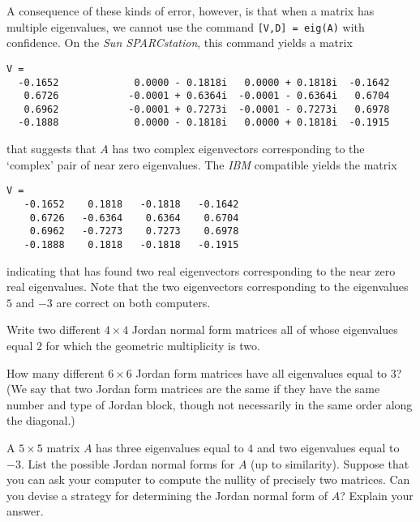 A consequence of these kinds of error, however, is that when a matrix
has multiple eigenvalues, we cannot use the command {\tt [V,D] = eig(A)} 
with confidence. On the {\em Sun SPARCstation\/}, this command yields 
a matrix 
\begin{verbatim}
V = 
  -0.1652             0.0000 - 0.1818i   0.0000 + 0.1818i  -0.1642          
   0.6726            -0.0001 + 0.6364i  -0.0001 - 0.6364i   0.6704          
   0.6962            -0.0001 + 0.7273i  -0.0001 - 0.7273i   0.6978          
  -0.1888             0.0000 - 0.1818i   0.0000 + 0.1818i  -0.1915          
\end{verbatim}
that suggests that $A$ has two complex eigenvectors corresponding 
to the `complex' pair of near zero eigenvalues.  The {\em IBM\/} 
compatible yields the matrix
\begin{verbatim}
V = 
   -0.1652    0.1818   -0.1818   -0.1642
    0.6726   -0.6364    0.6364    0.6704
    0.6962   -0.7273    0.7273    0.6978
   -0.1888    0.1818   -0.1818   -0.1915
\end{verbatim}
indicating that \Matlab has found two real eigenvectors corresponding 
to the near zero real eigenvalues.  Note that the two eigenvectors
corresponding to the eigenvalues $5$ and $-3$ are correct on both 
computers.     

\EXER

\TEXER


\begin{exercise} \label{c10.5.2}
Write two different $4\times 4$ Jordan normal form matrices all
of whose eigenvalues equal $2$ for which the geometric
multiplicity is two.
\end{exercise}

\begin{exercise} \label{c10.5.2A}
How many different $6\times 6$ Jordan form matrices have all eigenvalues 
equal to $3$? (We say that two Jordan form matrices are the same 
if they have the same number and type of Jordan block, though not
necessarily in the same order along the diagonal.)
\end{exercise}

\begin{exercise}  \label{c10.5.2B}
A $5\times 5$ matrix $A$ has three eigenvalues equal
to $4$ and two eigenvalues equal to $-3$.  List the possible Jordan normal 
forms for $A$ (up to similarity).  Suppose that you can ask your computer to
compute the nullity of precisely two matrices.  Can you devise a strategy for
determining the Jordan normal form of $A$?  Explain your answer.
\end{exercise}

